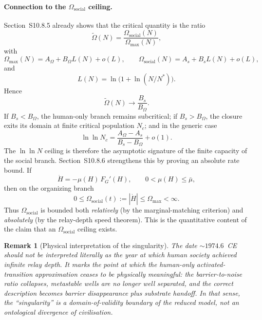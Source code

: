 \documentclass[11pt]{article}
\newtheorem{remark}{Remark}
\begin{document}
\paragraph{Connection to the \(\Omega_{\mathrm{social}}\) ceiling.}
Section~S10.8.5 already shows that the critical quantity is the ratio
\[
\tilde\Omega(N)=\frac{\Omega_{\mathrm{social}}(N)}{\Omega_{\max}(N)},
\]
with
\[
\Omega_{\max}(N)=A_\Omega+B_\Omega L(N)+o(L),\qquad\Omega_{\mathrm{social}}(N)=A_s+B_sL(N)+o(L),
\]
and
\[
L(N)=\ln\!\bigl(1+\ln(N/N^*)\bigr).
\]
Hence
\[
\tilde\Omega(N)\to \frac{B_s}{B_\Omega}.
\]
If \(B_s<B_\Omega\), the human-only branch remains subcritical; if
\(B_s>B_\Omega\), the closure exits its domain at finite critical population
\(N_c\); and in the generic case
\[
\ln\!\ln N_c=\frac{A_\Omega-A_s}{B_s-B_\Omega}+o(1).
\]
The \(\ln\!\ln N\) ceiling is therefore the asymptotic signature of the finite
capacity of the social branch.
Section~S10.8.6 strengthens this by proving an absolute rate bound.
If
\[
\dot H = -\mu(H)\,F_G'(H),\qquad 0<\mu(H)\le \bar\mu,
\]
then on the organizing branch
\[
0\le \Omega_{\mathrm{social}}(t):=|\dot H|\le \Omega_{\max} < \infty.
\]
Thus \(\Omega_{\mathrm{social}}\) is bounded both \emph{relatively}
(by the marginal-matching criterion) and \emph{absolutely}
(by the relay-depth speed theorem).
This is the quantitative content of the claim that an
\(\Omega_{\mathrm{social}}\) ceiling exists.

\begin{remark}[Physical interpretation of the singularity]
The date \(\sim 1974.6\)~CE should not be interpreted literally as the year
at which human society achieved infinite relay depth.
It marks the point at which the human-only activated-transition approximation
ceases to be physically meaningful:
the barrier-to-noise ratio collapses,
metastable wells are no longer well separated,
and the correct description becomes barrier disappearance plus substrate handoff.
In that sense, the ``singularity'' is a domain-of-validity boundary of the
reduced model, not an ontological divergence of civilisation.
\end{remark}
\end{document}
